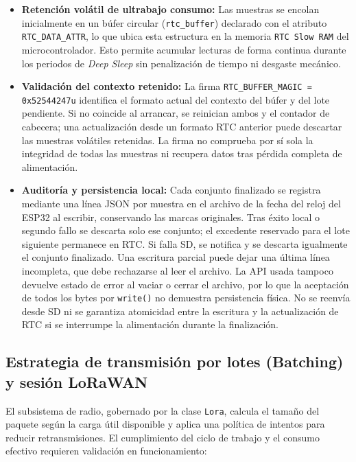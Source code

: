 \begin{itemize}
    \item \textbf{Retención volátil de ultrabajo consumo:} Las muestras se encolan inicialmente en un búfer circular (\texttt{rtc\_buffer}) declarado con el atributo \texttt{RTC\_DATA\_ATTR}, lo que ubica esta estructura en la memoria \texttt{RTC Slow RAM} del microcontrolador. Esto permite acumular lecturas de forma continua durante los periodos de \textit{Deep Sleep} sin penalización de tiempo ni desgaste mecánico.
    \item \textbf{Validación del contexto retenido:} La firma \texttt{RTC\_BUFFER\_MAGIC = 0x52544247u} identifica el formato actual del contexto del búfer y del lote pendiente. Si no coincide al arrancar, se reinician ambos y el contador de cabecera; una actualización desde un formato RTC anterior puede descartar las muestras volátiles retenidas. La firma no comprueba por sí sola la integridad de todas las muestras ni recupera datos tras pérdida completa de alimentación.
    \item \textbf{Auditoría y persistencia local:} Cada conjunto finalizado se registra mediante una línea JSON por muestra en el archivo de la fecha del reloj del ESP32 al escribir, conservando las marcas originales. Tras éxito local o segundo fallo se descarta solo ese conjunto; el excedente reservado para el lote siguiente permanece en RTC. Si falla SD, se notifica y se descarta igualmente el conjunto finalizado. Una escritura parcial puede dejar una última línea incompleta, que debe rechazarse al leer el archivo. La API usada tampoco devuelve estado de error al vaciar o cerrar el archivo, por lo que la aceptación de todos los bytes por \texttt{write()} no demuestra persistencia física. No se reenvía desde SD ni se garantiza atomicidad entre la escritura y la actualización de RTC si se interrumpe la alimentación durante la finalización.
\end{itemize}

\subsection{Estrategia de transmisión por lotes (Batching) y sesión LoRaWAN}
El subsistema de radio, gobernado por la clase \texttt{Lora}, calcula el tamaño del paquete según la carga útil disponible y aplica una política de intentos para reducir retransmisiones. El cumplimiento del ciclo de trabajo y el consumo efectivo requieren validación en funcionamiento:


